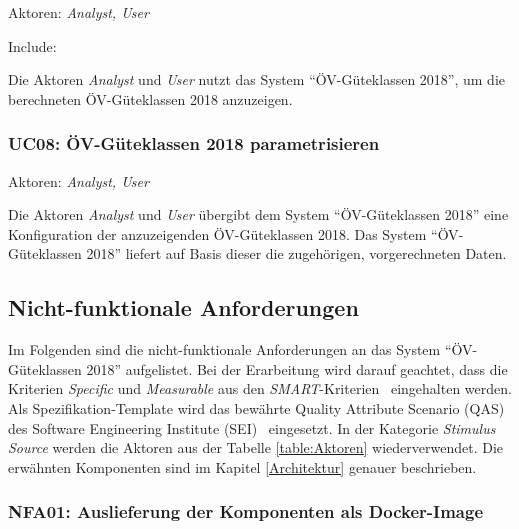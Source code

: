 Aktoren: \emph{Analyst, User}

Include: 

Die Aktoren \emph{Analyst} und \emph{User} nutzt das System "`\acs{ÖV}-Güteklassen 2018"', um die berechneten \acs{ÖV}-Güteklassen 2018 anzuzeigen.


\subsubsection{UC08: ÖV-Güteklassen 2018 parametrisieren}
\label{Use Cases:UC08}

Aktoren: \emph{Analyst, User}

Die Aktoren \emph{Analyst} und \emph{User} übergibt dem System "`\acs{ÖV}-Güteklassen 2018"' eine Konfiguration der anzuzeigenden \acs{ÖV}-Güteklassen 2018.
Das System "`\acs{ÖV}-Güteklassen 2018"' liefert auf Basis dieser die zugehörigen, vorgerechneten Daten.

\subsection{Nicht-funktionale Anforderungen}
\label{Anforderungsspezifikation:Nicht-funktionale Anforderungen}

Im Folgenden sind die nicht-funktionale Anforderungen an das System "`\acs{ÖV}-Güteklassen 2018"' aufgelistet.
Bei der Erarbeitung wird darauf geachtet, dass die Kriterien \emph{Specific} und \emph{Measurable} aus den \emph{SMART}-Kriterien~\cite{SMART} eingehalten werden.
Als Spezifikation-Template wird das bewährte Quality Attribute Scenario (QAS) des Software Engineering Institute (SEI)~\cite{BassSoftwareArchitecture2012} eingesetzt.
In der Kategorie \emph{Stimulus Source} werden die Aktoren aus der Tabelle \ref{table:Aktoren} wiederverwendet.
Die erwähnten Komponenten sind im Kapitel \ref{Architektur} genauer beschrieben.

\subsubsection{NFA01: Auslieferung der Komponenten als Docker-Image}
\label{NFA:NFA01}

